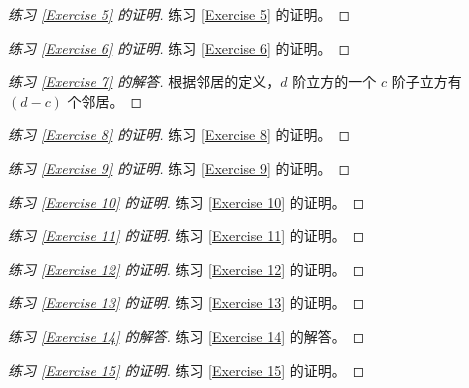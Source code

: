 \documentclass[12pt, a4paper]{article}
\newenvironment{answer}[1][Answer]{
	\begin{proof}[#1]
	\let\qed\relax
}{
	\end{proof}
}
\begin{document}
\begin{proof}[练习 \ref{Exercise 5} 的证明]
练习 \ref{Exercise 5} 的证明。
\end{proof}

\begin{proof}[练习 \ref{Exercise 6} 的证明]
练习 \ref{Exercise 6} 的证明。
\end{proof}

\begin{answer}[练习 \ref{Exercise 7} 的解答]
根据邻居的定义，$d$ 阶立方的一个 $c$ 阶子立方有 $(d - c)$ 个邻居。
\end{answer}

\begin{proof}[练习 \ref{Exercise 8} 的证明]
练习 \ref{Exercise 8} 的证明。
\end{proof}

\begin{proof}[练习 \ref{Exercise 9} 的证明]
练习 \ref{Exercise 9} 的证明。
\end{proof}

\begin{proof}[练习 \ref{Exercise 10} 的证明]
练习 \ref{Exercise 10} 的证明。
\end{proof}

\begin{proof}[练习 \ref{Exercise 11} 的证明]
练习 \ref{Exercise 11} 的证明。
\end{proof}

\begin{proof}[练习 \ref{Exercise 12} 的证明]
练习 \ref{Exercise 12} 的证明。
\end{proof}

\begin{proof}[练习 \ref{Exercise 13} 的证明]
练习 \ref{Exercise 13} 的证明。
\end{proof}

\begin{answer}[练习 \ref{Exercise 14} 的解答]
练习 \ref{Exercise 14} 的解答。
\end{answer}

\begin{proof}[练习 \ref{Exercise 15} 的证明]
练习 \ref{Exercise 15} 的证明。
\end{proof}
\end{document}
